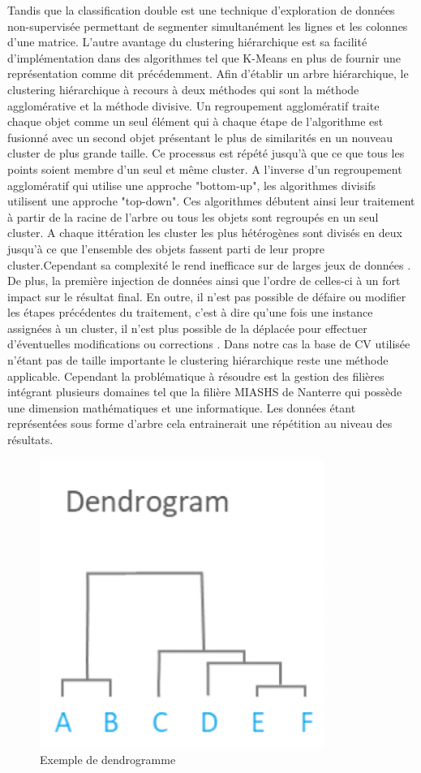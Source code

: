 \documentclass[memoire.tex]{subfiles}
\begin{document}
 Tandis que la classification double est une technique d'exploration de données non-supervisée permettant de segmenter simultanément les lignes et les colonnes d'une matrice. L'autre avantage du clustering hiérarchique est sa facilité d'implémentation dans des algorithmes tel que K-Means en plus de fournir une représentation comme dit précédemment. Afin d'établir un arbre hiérarchique, le clustering hiérarchique à recours à deux méthodes qui sont la méthode agglomérative et la méthode divisive. Un regroupement agglomératif traite chaque objet comme un seul élément qui à chaque étape de l'algorithme est fusionné avec un second objet présentant le plus de similarités en un nouveau cluster de plus grande taille. Ce processus est répété jusqu'à que ce que tous les points soient membre d'un seul et même cluster. A l'inverse d'un regroupement agglomératif qui utilise une approche "bottom-up", les algorithmes divisifs utilisent une approche "top-down". Ces algorithmes débutent ainsi leur traitement à partir de la racine de l'arbre ou tous les objets sont regroupés en un seul cluster. A chaque ittération les cluster les plus hétérogènes sont divisés en deux jusqu'à ce que l'ensemble des objets fassent parti de leur propre cluster.Cependant sa complexité le rend inefficace sur de larges jeux de données \cite{ref7}. De plus, la première injection de données ainsi que l'ordre de celles-ci  à un fort impact sur le résultat final. En outre, il n'est pas possible de défaire ou modifier les étapes précédentes du traitement, c'est à dire qu'une fois une instance assignées à un cluster, il n'est plus possible de la déplacée pour effectuer d'éventuelles modifications ou corrections \cite{ref5}. Dans notre cas la base de CV utilisée n'étant pas de taille importante le clustering hiérarchique reste une méthode applicable. Cependant la problématique à résoudre est la gestion des filières intégrant plusieurs domaines tel que la filière MIASHS de Nanterre qui possède une dimension mathématiques et une informatique. Les données étant représentées sous forme d'arbre cela entrainerait une répétition au niveau des résultats.
	\begin{figure}
		\includegraphics[scale=0.8]{img/hierarchical_clustering.png}
		\caption{Exemple de dendrogramme}
	\end{figure}
	
\end{document}
